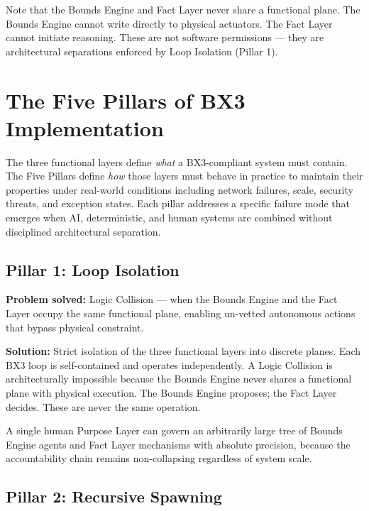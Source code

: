 \documentclass[12pt]{article}
\begin{document}
\vspace{0.5em}
\noindent Note that the Bounds Engine and Fact Layer never share a functional plane. The Bounds Engine cannot write directly to physical actuators. The Fact Layer cannot initiate reasoning. These are not software permissions --- they are architectural separations enforced by Loop Isolation (Pillar 1).

\section{The Five Pillars of BX3 Implementation}
\label{sec:pillars}

The three functional layers define \textit{what} a BX3-compliant system must contain. The Five Pillars define \textit{how} those layers must behave in practice to maintain their properties under real-world conditions including network failures, scale, security threats, and exception states. Each pillar addresses a specific failure mode that emerges when AI, deterministic, and human systems are combined without disciplined architectural separation.

\subsection{Pillar 1: Loop Isolation}

\textbf{Problem solved:} Logic Collision --- when the Bounds Engine and the Fact Layer occupy the same functional plane, enabling un-vetted autonomous actions that bypass physical constraint.

\textbf{Solution:} Strict isolation of the three functional layers into discrete planes. Each BX3 loop is self-contained and operates independently. A Logic Collision is architecturally impossible because the Bounds Engine never shares a functional plane with physical execution. The Bounds Engine proposes; the Fact Layer decides. These are never the same operation.

A single human Purpose Layer can govern an arbitrarily large tree of Bounds Engine agents and Fact Layer mechanisms with absolute precision, because the accountability chain remains non-collapsing regardless of system scale.

\subsection{Pillar 2: Recursive Spawning}
\end{document}

